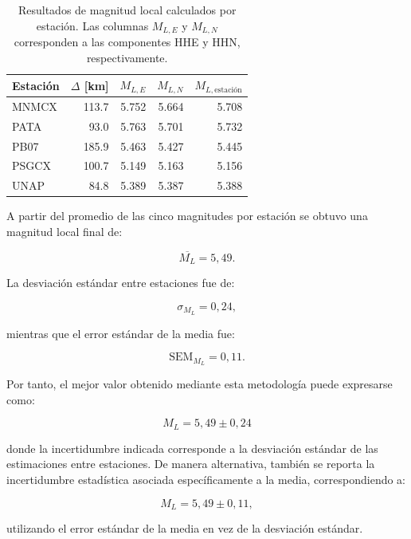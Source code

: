 \documentclass[a4paper,12pt]{article} %
\numberwithin{equation}{section} %
\numberwithin{figure}{section} %
\begin{document}
\begin{table}[]
    \centering
    \caption{Resultados de magnitud local calculados por estación. Las columnas \(M_{L,E}\) y \(M_{L,N}\) corresponden a las componentes HHE y HHN, respectivamente.}
    \label{tab:ml-componentes-estaciones}
    \begin{tabular}{l r r r r}
        \hline
        Estación & $\Delta$ [km] & $M_{L,E}$ & $M_{L,N}$ &
        $M_{L,\mathrm{estación}}$ \\
        \hline
        MNMCX & 113.7 & 5.752 & 5.664 & 5.708 \\
        PATA  &  93.0 & 5.763 & 5.701 & 5.732 \\
        PB07  & 185.9 & 5.463 & 5.427 & 5.445 \\
        PSGCX & 100.7 & 5.149 & 5.163 & 5.156 \\
        UNAP  &  84.8 & 5.389 & 5.387 & 5.388 \\
        \hline
    \end{tabular}
\end{table}

A partir del promedio de las cinco magnitudes por estación se obtuvo una magnitud local final de:

\[
\overline{M_L} = 5{,}49.
\]

La desviación estándar entre estaciones fue de:

\[
\sigma_{M_L} = 0{,}24,
\]

mientras que el error estándar de la media fue:

\[
\mathrm{SEM}_{M_L} = 0{,}11.
\]

Por tanto, el mejor valor obtenido mediante esta metodología puede expresarse como:

\[
\boxed{
M_L = 5{,}49 \pm 0{,}24
}
\]

donde la incertidumbre indicada corresponde a la desviación estándar de las estimaciones entre estaciones. De manera alternativa, también se reporta la incertidumbre estadística asociada específicamente a la media, correspondiendo a:

\[
M_L = 5{,}49 \pm 0{,}11,
\]

utilizando el error estándar de la media en vez de la desviación estándar.

\vspace{1cm}
\end{document}
